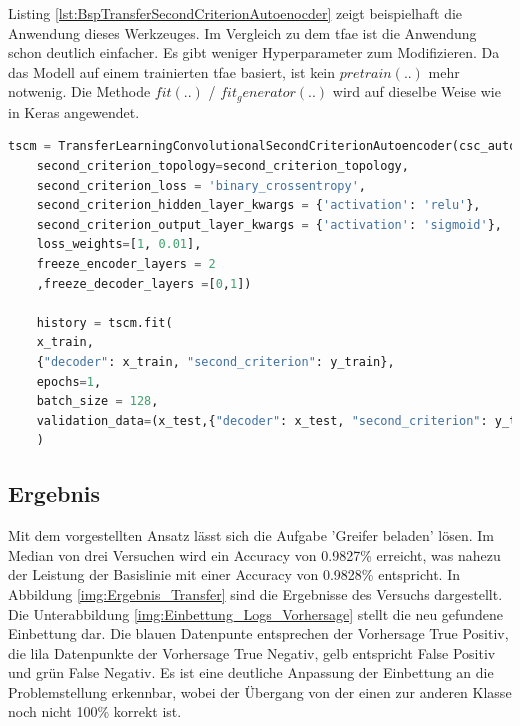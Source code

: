 	Listing \ref{lst:BspTransferSecondCriterionAutoenocder} zeigt beispielhaft die Anwendung dieses Werkzeuges. Im Vergleich zu dem \ac{tfae} ist die Anwendung schon deutlich einfacher. Es gibt weniger Hyperparameter zum Modifizieren. Da das Modell auf einem trainierten \ac{tfae} basiert, ist kein $pretrain(..)$ mehr notwenig. Die Methode $fit(..)$ / $fit_generator(..)$ wird auf dieselbe Weise wie in Keras angewendet.	
	
	\begin{lstlisting}[language=python,caption=Beispiel TransferSecondCriterionAutoenocder in Python, label=lst:BspTransferSecondCriterionAutoenocder]
	tscm = TransferLearningConvolutionalSecondCriterionAutoencoder(csc_autoencoder,
	second_criterion_topology=second_criterion_topology,
	second_criterion_loss = 'binary_crossentropy',                                                                                                   
	second_criterion_hidden_layer_kwargs = {'activation': 'relu'},
	second_criterion_output_layer_kwargs = {'activation': 'sigmoid'}, 
	loss_weights=[1, 0.01],
	freeze_encoder_layers = 2
	,freeze_decoder_layers =[0,1])
	
	history = tscm.fit(
	x_train,
	{"decoder": x_train, "second_criterion": y_train}, 
	epochs=1,
	batch_size = 128,
	validation_data=(x_test,{"decoder": x_test, "second_criterion": y_test}))
	)
	\end{lstlisting}	
	
	\subsection{Ergebnis}
	Mit dem vorgestellten Ansatz lässt sich die Aufgabe 'Greifer beladen' lösen. Im Median von drei Versuchen wird ein Accuracy von 0.9827\% erreicht, was nahezu der Leistung der Basislinie mit einer Accuracy von 0.9828\% entspricht. In Abbildung \ref{img:Ergebnis_Transfer} sind die Ergebnisse des Versuchs dargestellt. Die Unterabbildung \ref{img:Einbettung_Logs_Vorhersage} stellt die neu gefundene Einbettung dar. Die blauen Datenpunte entsprechen der Vorhersage True Positiv, die lila Datenpunkte der Vorhersage True Negativ, gelb entspricht False Positiv und grün False Negativ. Es ist eine deutliche Anpassung der Einbettung an die Problemstellung erkennbar, wobei der Übergang von der einen zur anderen Klasse noch nicht 100\% korrekt ist.  

